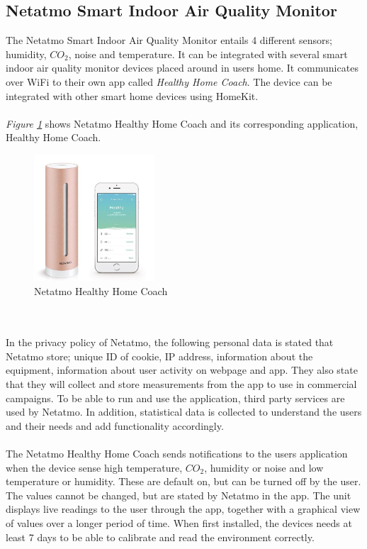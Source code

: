 \subsection{Netatmo Smart Indoor Air Quality Monitor}
The Netatmo Smart Indoor Air Quality Monitor entails 4 different sensors; humidity, \(CO_2\), noise and temperature. It can be integrated with several smart indoor air quality monitor devices placed around in users home. It communicates over WiFi to their own app called \textit{Healthy Home Coach}. The device can be integrated with other smart home devices using HomeKit. 
\\\\
\textit{Figure \ref{fig:Netatmo}} shows Netatmo Healthy Home Coach and its corresponding application, Healthy Home Coach. 
\begin{figure} [!ht]
    \centering
    \includegraphics[width=0.4\textwidth]{figures/Netatmo.png}
    \caption{Netatmo Healthy Home Coach \cite{NetatmoDevice}}
    \label{fig:Netatmo}
\end{figure}
\\\\
In the privacy policy of Netatmo, the following personal data is stated that Netatmo store; unique ID of cookie, IP address, information about the equipment, information about user activity on webpage and app. They also state that they will collect and store measurements from the app to use in commercial campaigns. To be able to run and use the application, third party services are used by Netatmo. In addition, statistical data is collected to understand the users and their needs and add functionality accordingly.  
\\\\
The Netatmo Healthy Home Coach sends notifications to the users application when the device sense high temperature, \(CO_2\), humidity or noise and low temperature or humidity. These are default on, but can be turned off by the user. The values cannot be changed, but are stated by Netatmo in the app. The unit displays live readings to the user through the app, together with a graphical view of values over a longer period of time. When first installed, the devices needs at least 7 days to be able to calibrate and read the environment correctly. 


